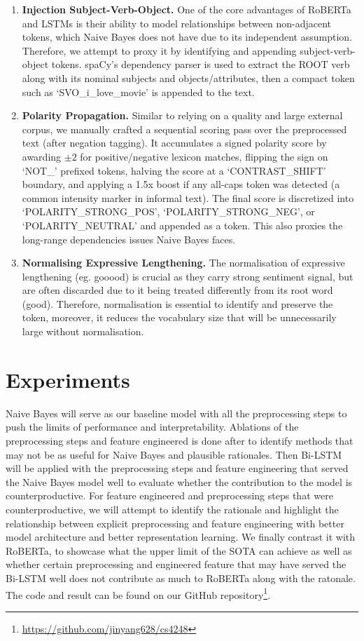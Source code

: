 \documentclass[11pt]{article}
\begin{document}
\begin{enumerate}
    \item \textbf{Injection Subject-Verb-Object.} One of the core advantages of RoBERTa and LSTMs is their ability to model relationships between non-adjacent tokens, which Naive Bayes does not have due to its independent assumption. Therefore, we attempt to proxy it by identifying and appending subject-verb-object tokens. spaCy's dependency parser is used to extract the ROOT verb along with its nominal subjects and objects/attributes, then a compact token such as `SVO\_i\_love\_movie' is appended to the text.
    \item \textbf{Polarity Propagation.} Similar to relying on a quality and large external corpus, we manually crafted a sequential scoring pass over the preprocessed text (after negation tagging). It accumulates a signed polarity score by awarding \(\pm 2\) for positive/negative lexicon matches, flipping the sign on `NOT\_' prefixed tokens, halving the score at a `CONTRAST\_SHIFT' boundary, and applying a 1.5x boost if any all-caps token was detected (a common intensity marker in informal text). The final score is discretized into `POLARITY\_STRONG\_POS', `POLARITY\_STRONG\_NEG', or `POLARITY\_NEUTRAL' and appended as a token. This also proxies the long-range dependencies issues Naive Bayes faces.
    \item \textbf{Normalising Expressive Lengthening.} The normalisation of expressive lengthening (eg. gooood) is crucial as they carry strong sentiment signal, but are often discarded due to it being treated differently from its root word (good). Therefore, normalisation is essential to identify and preserve the token, moreover, it reduces the vocabulary size that will be unnecessarily large without normalisation.
\end{enumerate}

\section{Experiments}
Naive Bayes will serve as our baseline model with all the preprocessing steps to push the limits of performance and interpretability. Ablations of the preprocessing steps and feature engineered is done after to identify methods that may not
be as useful for Naive Bayes and plausible rationales. Then Bi-LSTM will be applied with the preprocessing steps and feature engineering that served the Naive Bayes model well to evaluate whether the contribution to the model is counterproductive. 
For feature engineered and preprocessing steps that were counterproductive, we will attempt to identify the rationale and highlight the relationship between explicit preprocessing and feature engineering with better model architecture and better representation learning.
We finally contrast it with RoBERTa, to showcase what the upper limit of the SOTA can achieve as well as whether certain preprocessing and engineered feature that may have served the Bi-LSTM well does not contribute as much to RoBERTa along with the ratonale.
The code and result can be found on our GitHub repository\footnote{\url{https://github.com/jinyang628/cs4248}}.
\end{document}
